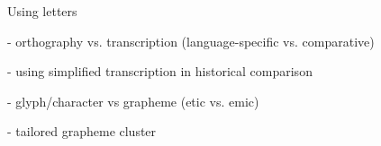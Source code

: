
Using letters

- orthography vs. transcription (language-specific vs. comparative)

- using simplified transcription in historical comparison

- glyph/character vs grapheme (etic vs. emic)

- tailored grapheme cluster
